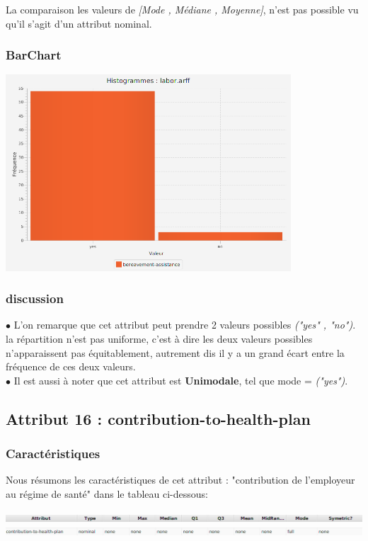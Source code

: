\documentclass[12pt,a4paper,oneside]{book}
\begin{document}
	La comparaison les valeurs de \textit{[Mode , Médiane , Moyenne]}, n'est pas possible vu qu'il s'agit d'un attribut nominal.
	
	\subsubsection{BarChart}
	
	\begin{center}
		\includegraphics[width=0.8\textwidth]{screens/barchart/bereavement-assistance-barchart.png}%
		\label{labelname}%
	\end{center}
	
	\subsubsection{discussion}
	$\bullet $ L'on remarque que cet attribut peut prendre 2 valeurs possibles \textit{("yes" , "no")}.  la répartition n'est pas uniforme, c'est à dire les deux valeurs possibles n'apparaissent pas équitablement, autrement dis il y a un grand écart entre la fréquence de ces deux valeurs.\\
	$\bullet $ Il est aussi à noter que cet attribut est \textbf{Unimodale}, tel que mode = \textit{("yes")}.
	
	\newpage
	
	\subsection{Attribut 16 : contribution-to-health-plan }
	\subsubsection{Caractéristiques}
	Nous résumons les caractéristiques de cet attribut : "contribution de l'employeur au régime de santé" dans le tableau ci-dessous:
	\begin{center}
		\includegraphics[width=1\textwidth]{screens/att.png}\\ \includegraphics[width=1\textwidth]{screens/att-16.png}%
		\label{labelname}%
	\end{center}
	
\end{document}
